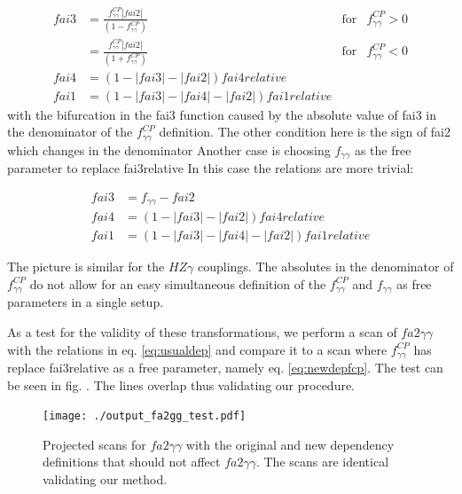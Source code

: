 \documentclass[10pt,a4paper]{article}
\begin{document}
\begin{equation}\label{eq:newdepfcp}
\begin{align}
fai3 &= \frac{f_{\gamma\gamma}^{CP} |fai2|}{(1 -f_{\gamma\gamma}^{CP})}   &\mathrm{ for } &f_{\gamma\gamma}^{CP} > 0  \\
     &= \frac{f_{\gamma\gamma}^{CP} |fai2|}{(1 + f_{\gamma\gamma}^{CP})}  &\mathrm{ for } &f_{\gamma\gamma}^{CP} < 0  \\
fai4 &= (1-|fai3| -|fai2| )fai4relative\\
fai1 &= (1-|fai3| -|fai4| - |fai2| )fai1relative
\end{align}
\end{equation}
with the bifurcation in the fai3 function caused by the absolute value of fai3 in the denominator of the $f_{\gamma\gamma}^{CP}$ definition. The other condition here is the sign of fai2 which changes in the denominator
Another case is choosing $f_{\gamma\gamma}$ as the free parameter to replace fai3relative
In this case the relations are more trivial: 

\begin{equation}\label{eq:newdepfgg}
\begin{align}
fai3 &= f_{\gamma\gamma} -  fai2\\
fai4 &= (1-|fai3| -|fai2| )fai4relative\\
fai1 &= (1-|fai3| -|fai4| - |fai2| )fai1relative
\end{align}
\end{equation}

The picture is similar for the $HZ\gamma$ couplings.
The absolutes in the denominator of  $f_{\gamma\gamma}^{CP}$ do not allow for an easy simultaneous definition of the $f_{\gamma\gamma}^{CP}$ and $f_{\gamma\gamma}$ as free parameters in a single setup. 

As a test for the validity of these transformations, we perform a scan of $fa2\gamma\gamma$ with the relations in eq.  \ref{eq:usualdep} and compare it to a scan where  $f_{\gamma\gamma}^{CP}$ has replace fai3relative as a free parameter, namely eq. \ref{eq:newdepfcp}. The test can be seen in fig. . The lines overlap thus validating our procedure. 

\begin{figure}[t]
\centering
\texttt{[image: ./output\_fa2gg\_test.pdf]}
\caption{Projected scans for $fa2\gamma\gamma$ with the original and new dependency definitions that should not affect $fa2\gamma\gamma$. The scans are identical validating our method. }
\label{fig:fcgg}
\end{figure}
\end{document}
